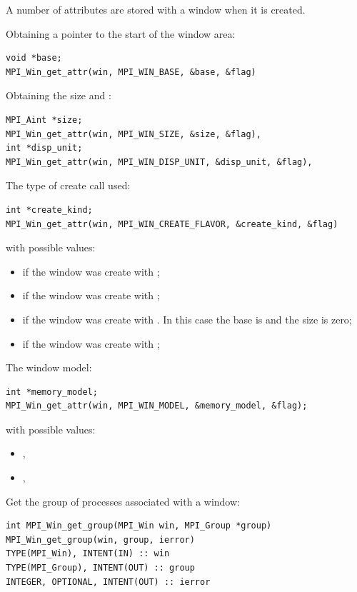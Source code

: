 A number of attributes are stored with a window when it is created.

Obtaining a pointer to the start of the window area:
\begin{lstlisting}
void *base;
MPI_Win_get_attr(win, MPI_WIN_BASE, &base, &flag)  
\end{lstlisting}

Obtaining the size and :
\begin{lstlisting}
MPI_Aint *size;
MPI_Win_get_attr(win, MPI_WIN_SIZE, &size, &flag), 
int *disp_unit;
MPI_Win_get_attr(win, MPI_WIN_DISP_UNIT, &disp_unit, &flag), 
\end{lstlisting}

The type of create call used:
\begin{lstlisting}
int *create_kind;
MPI_Win_get_attr(win, MPI_WIN_CREATE_FLAVOR, &create_kind, &flag)
\end{lstlisting}
with possible values:
\begin{itemize}
\item {} if the window was create
  with ;
\item {} if the window was create
  with ;
\item {} if the window was create
  with . In this case the base is
   and the size is zero;
\item {} if the window was create
  with ;
\end{itemize}

The window model:
\begin{lstlisting}
int *memory_model;
MPI_Win_get_attr(win, MPI_WIN_MODEL, &memory_model, &flag);
\end{lstlisting}
with possible values:
\begin{itemize}
\item {},
\item {},
\end{itemize}

Get the group of processes associated with a window:
\begin{verbatim}
int MPI_Win_get_group(MPI_Win win, MPI_Group *group) 
MPI_Win_get_group(win, group, ierror) 
TYPE(MPI_Win), INTENT(IN) :: win 
TYPE(MPI_Group), INTENT(OUT) :: group 
INTEGER, OPTIONAL, INTENT(OUT) :: ierror
\end{verbatim}

